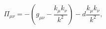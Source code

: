 \begin{equation}
\Pi_{\mu\nu}=-(g_{\mu\nu}-\frac{k_{\mu}k_{\nu}}{k^{2}})-d\frac{k_{\mu}k_{\nu}%
}{k^{2}},
\end{equation}

